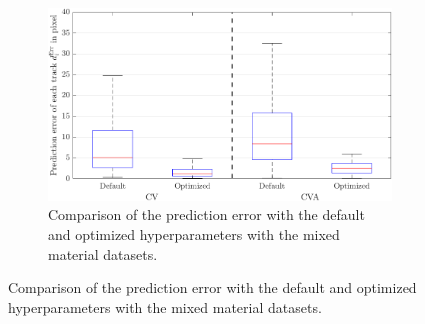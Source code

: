 \begin{figure}
    \ContinuedFloat
    \centering
	\begin{subfigure}[t]{0.8\textwidth}
		\includegraphics[width=\textwidth]{figures/KF/bayopt/effectOpt misch.png}
		\caption{Comparison of the prediction error with the default and optimized hyperparameters with the mixed material datasets.}
	\end{subfigure}
\end{figure}


